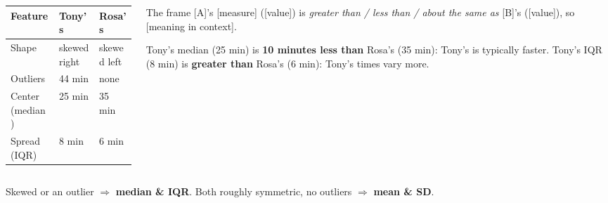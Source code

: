 \documentclass[aspectratio=169, 11pt]{beamer}
\newcommand{\redink}[1]{{\color{redacc}\bfseries #1}}
\begin{document}
\begin{frame}[t, plain]
  \begin{columns}[t]
    \begin{column}{0.44\textwidth}
      \small
      \renewcommand{\arraystretch}{1.3}
      \begin{tabular}{@{} l l l @{}}
      \hline
      \textbf{Feature} & \textbf{Tony's} & \textbf{Rosa's} \\
      \hline
      Shape    & skewed right & skewed left \\
      Outliers & 44 min       & none \\
      Center (median) & 25 min & 35 min \\
      Spread (IQR)    & 8 min  & 6 min \\
      \hline
      \end{tabular}
    \end{column}
    \begin{column}{0.52\textwidth}
      \begin{block}{The frame}
        [A]'s [measure] ([value]) is \emph{greater than / less than / about the same as}
        [B]'s ([value]), so [meaning in context].
      \end{block}
      {\small Tony's median (25 min) is \textbf{10 minutes less than} Rosa's (35 min): Tony's
      is typically faster. Tony's IQR (8 min) is \textbf{greater than} Rosa's (6 min): Tony's
      times vary more.}
    \end{column}
  \end{columns}
  \vspace{6pt}
  \begin{center}
    Skewed or an outlier $\Rightarrow$ \redink{median \& IQR}. \quad Both roughly symmetric,
    no outliers $\Rightarrow$ \redink{mean \& SD}.
  \end{center}
\end{frame}
\end{document}
